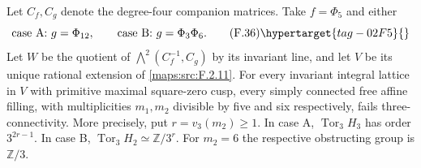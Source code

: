 \begin{theorem}\hypertarget{tag-02N2}{}\label{maps:src:F.2.13}


Let $C_f,C_g$ denote the degree-four companion matrices.
Take $f=\Phi_5$ and either
\[
 \text{case A: }g=\Phi_{12},\qquad
 \text{case B: }g=\Phi_3\Phi_6.
 \tag{F.36}\hypertarget{tag-02F5}{}\label{maps:eq:F.36}
\]
Let $W$ be the quotient of
$\bigwedge^2(C_f^{-1},C_g)$ by its invariant line, and
let $V$ be its unique rational extension of \ref{maps:src:F.2.11}.
For every invariant integral lattice in $V$ with primitive
maximal square-zero cusp, every simply connected free affine
filling, with multiplicities $m_1,m_2$ divisible by five and
six respectively, fails three-connectivity.
More precisely, put $r=v_3(m_2)\geq1$.
In case A, $\operatorname{Tor}_3 H_3$ has order
$3^{2r-1}$.  In case B,
$\operatorname{Tor}_3 H_2\simeq\mathbb Z/3^r$.
For $m_2=6$ the respective obstructing group is $\mathbb Z/3$.

\end{theorem}


